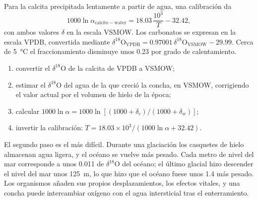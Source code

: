 Para la calcita precipitada lentamente a partir de agua, una calibración da
\[
1000\ln\alpha_{\mathrm{calcite-water}} = 18.03\,\frac{10^3}{T} - 32.42,
\]
con ambos valores $\delta$ en la escala VSMOW. Los carbonatos se expresan en la
escala VPDB, convertida mediante $\delta^{18}\mathrm O_{\mathrm{VPDB}} =
0.97001\,\delta^{18}\mathrm O_{\mathrm{VSMOW}} - 29.99$. Cerca de \qty{5}{\celsius} el
fraccionamiento disminuye unos \qty{0.23}{\permil} por grado de calentamiento.

\begin{method}\label{met:b3:stable-isotopes:palaeotemperature}
\begin{enumerate}
\item convertir el $\delta^{18}\mathrm O$ de la calcita de VPDB a VSMOW;
\item estimar el $\delta^{18}\mathrm O$ del agua de la que creció la concha, en
VSMOW, corrigiendo el valor actual por el volumen de hielo de la época;
\item calcular $1000\ln\alpha = 1000\ln[(1000 + \delta_c)/(1000 + \delta_w)]$;
\item invertir la calibración: $T = 18.03\times10^3/(1000\ln\alpha + 32.42)$.
\end{enumerate}
\end{method}

El segundo paso es el más difícil. Durante una glaciación los casquetes de hielo almacenan
agua ligera, y el océano se vuelve más pesado. Cada metro de nivel del mar corresponde
a unos \qty{0.011}{\permil} de $\delta^{18}\mathrm O$ del océano; el último glacial
hizo descender el nivel del mar unos \qty{125}{m}, lo que hizo que el océano fuese unos
\qty{1.4}{\permil} más pesado. Los organismos añaden sus propios desplazamientos, los
efectos vitales, y una concha puede intercambiar oxígeno con el agua intersticial tras el enterramiento.

